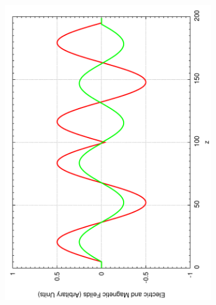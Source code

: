 \begin{figure}[ht]
        \centering
        \begin{subfigure}[ht]{0.45\textwidth}
                \centering
                \includegraphics[angle=270, width=\textwidth]{infsine.pdf}
        \end{subfigure}%
        ~
        \begin{subfigure}[ht]{0.45\textwidth}
                \centering

\end{subfigure}
\end{figure}
